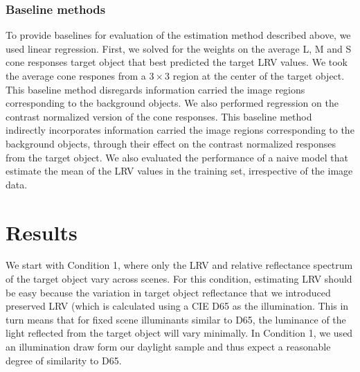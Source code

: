 \documentclass{jov}
\begin{document}
\subsubsection*{Baseline methods}

To provide baselines for evaluation of the estimation method described above, we used linear regression.
First, we solved for the weights on the average L, M and S cone responses target object that best predicted the target LRV values.
We took the average cone respones from a $3 \times 3$ region at the center of the target object.
This baseline method disregards information carried the image regions corresponding to the background objects.
We also performed regression on the contrast normalized version of the cone responses.
This baseline method indirectly incorporates information carried the image regions corresponding to the background objects,
through their effect on the contrast normalized responses from the target object. 
We also evaluated the performance of a naive model that estimate the mean of the LRV values in the training set, irrespective
of the image data.

%

\section{Results} \label{Results}

We start with Condition 1, where only the LRV and relative reflectance spectrum of the target object vary across scenes.
For this condition, estimating LRV should be easy because the variation in target object reflectance that we introduced
preserved LRV (which is calculated using a CIE D65 as the illumination.
This in turn means that for fixed scene illuminants similar to D65, the luminance of the light reflected from the target object will
vary minimally.
In Condition 1, we used an illumination draw form our daylight sample and thus expect a reasonable degree of similarity to D65.
\end{document}
